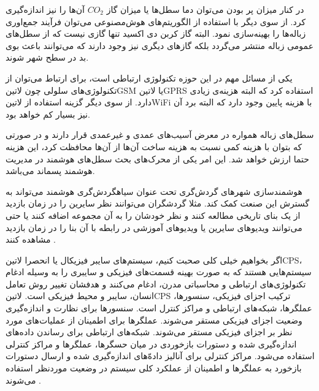 در کنار میزان پر بودن می‌توان دما سطل‌ها یا میزان گاز $CO_{2}$ آن‌ها را نیز اندازه‌گیری کرد. از سوی دیگر با استفاده از الگوریتم‌های هوش‌مصنوعی می‌توان فرآیند جمع‌اوری زباله‌ها را بهینه‌سازی نمود.
البته گاز کربن دی اکسید تنها گازی نیست که از سطل‌های عمومی زباله منتشر می‌گردد بلکه گازهای دیگری نیز وجود دارند که می‌توانند باعث بوی بد در سطح شهر شوند.

یکی از مسائل مهم در این حوزه تکنولوژی ارتباطی است، برای ارتباط می‌توان از تکنولوژی‌های سلولی چون ‌لاتین{GSM} یا ‌لاتین{GPRS} استفاده کرد که البته هزینه‌ی زیادی دارد.
از سوی دیگر گزینه استفاده از ‌لاتین{WiFi} با هزینه پایین وجود دارد که البته برد آن نیز بسیار کم خواهد بود.

سطل‌های زباله همواره در معرض آسیب‌های عمدی و غیرعمدی قرار دارند و در صورتی که بتوان با هزینه کمی نسبت به هزینه ساخت آن‌ها از آن‌ها محافظت کرد، این هزینه حتما ارزش خواهد شد.
این امر یکی از محرک‌های بحث سطل‌های هوشمند در مدیریت هوشمند پسماند می‌باشد.

هوشمند‌سازی شهرهای گردش‌گری تحت عنوان ‌سیاه{گردش‌گری هوشمند} می‌تواند به گسترش این صنعت کمک کند. مثلا گردشگران می‌توانند نظر سایرین را در زمان بازدید از یک بنای تاریخی مطالعه کنند و نظر خودشان را به آن مجموعه اضافه کنند
یا حتی می‌توانند ویدیوهای سایرین یا ویدیوهای آموزشی در رابطه با آن بنا را در زمان بازدید مشاهده کنند
.


اگر بخواهیم خیلی کلی صحبت کنیم، سیستم‌های سایبر فیزیکال یا انحصرا ‌لاتین{CPS}، سیستم‌هایی هستند که به صورت بهینه قسمت‌های فیزیکی و سایبری را به وسیله ادغام تکنولوژی‌های ارتباطی و محاسباتی مدرن،
ادغام می‌کنند و هدفشان تغییر روش تعامل انسان، سایبر و محیط فیزیکی است.
‌لاتین{CPS} ترکیب اجزای فیزیکی، سنسورها، عملگرها، شبکه‌های ارتباطی و مراکز کنترل است. سنسورها برای نظارت و اندازه‌گیری وضعیت اجزای فیزیکی مستقر می‌شوند.
عملگرها برای اطمینان از عملیات‌های مورد نظر بر اجزای فیزیکی مستقر می‌شوند. شبکه‌های ارتباطی برای رساندن داده‌های اندازه‌گیری شده و دستورات بازخوردی در میان حسگرها، عملگرها و مراکز کنترلی استفاده می‌شود.
مراکز کنترلی برای آنالیز داده‌ّهای اندازه‌گیری شده و ارسال دستورات بازخورد به عملگرها و اطمینان از عملکرد کلی سیستم در وضعیت موردنظر استفاده می‌شوند
.

